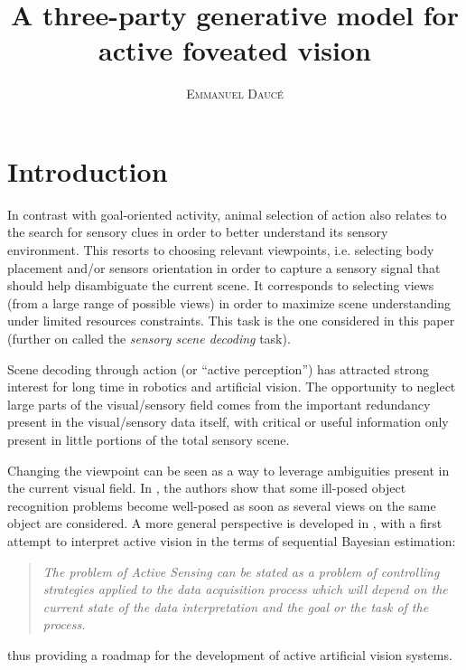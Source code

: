 \documentclass[12pt,twoside,openright]{article}
\title{\textbf{A three-party generative model for active foveated vision} }
\author{\textsc{Emmanuel Daucé}}%
\date{}
\begin{document}
	
\maketitle


	
\section{Introduction}

In contrast with goal-oriented activity, animal selection of action also relates to the search for sensory clues in order to better understand its sensory environment. This resorts to choosing relevant viewpoints, i.e. selecting body placement and/or sensors orientation in order to capture a sensory signal that should help disambiguate the current scene. It corresponds to selecting views (from a large range of possible views) in order to maximize scene understanding under limited resources constraints. This task is the one considered in this paper (further on called the \emph{sensory scene decoding} task). 



Scene decoding through action (or ``active perception'') has attracted strong interest for long time in robotics and artificial vision.  The opportunity to neglect large parts of the {\color{blue} visual/sensory} field comes from the important redundancy present in the {\color{blue} visual/sensory} data itself, with critical or useful information only present in little portions of the total sensory scene.

Changing the viewpoint can be seen as a way to leverage ambiguities present in the current visual field. In \cite{aloimonos1988active}, the authors show that some ill-posed object recognition problems become well-posed as soon as several views on the  same object are considered. 
A more general perspective is developed in \cite{bajcsy1988active}, with a first attempt to interpret active vision in the terms of sequential Bayesian estimation:
\begin{quote}
	\emph{The problem  of Active Sensing can be stated as a problem of controlling strategies 
		applied to the data acquisition process which will depend on the current state 
		of the data interpretation and  the  goal  or the  task of  the  process.}
\end{quote}
thus providing a roadmap for the development of active artificial vision systems.
\end{document}
